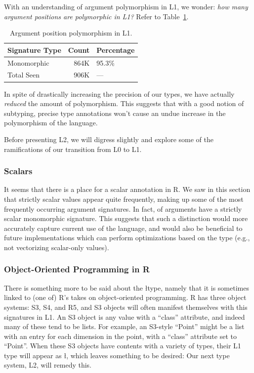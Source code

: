 \documentclass[acmsmall,10pt,review,anonymous]{acmart}\settopmatter{printfolios=true,printccs=false,printacmref=false}
\begin{document}
With an understanding of argument polymorphism in L1, we wonder: {\it how many argument positions are polymorphic in L1?}
Refer to Table~\ref{tab:argcountsL1}.

\begin{table}[ht]
\label{tab:argcountsL1}
\centering
\begin{tabular}{lrl}
  \hline
Signature Type & Count & Percentage \\ 
  \hline
Monomorphic & 864K & 95.3\% \\ 
  Total Seen & 906K & --- \\ 
   \hline
\end{tabular}
\caption{Argument position polymorphism in L1.}
\end{table}

In spite of drastically increasing the precision of our types, we have actually {\it reduced} the amount of polymorphism.
This suggests that with a good notion of subtyping, precise type annotations won't cause an undue increase in the polymorphism of the language.

Before presenting L2, we will digress slightly and explore some of the ramifications of our transition from L0 to L1.

%
%
\subsubsection{Scalars}
\label{sec:scalars}

It seems that there is a place for a scalar annotation in R.
We saw in this section that strictly scalar values appear quite frequently, making up some of the most frequently occurring argument signatures.
In fact, \PERCSCALARMONO of arguments have a strictly scalar monomorphic signature.
This suggests that such a distinction would more accurately capture current use of the language, and would also be beneficial to future implementations which can perform optimizations based on the type (e.g., not vectorizing scalar-only values).

%
%
\subsubsection{Object-Oriented Programming in R}
\label{sec:S3S4R5}

There is something more to be said about the \l type, namely that it is sometimes linked to (one of) R's takes on object-oriented programming.
R has three object systems: S3, S4, and R5, and S3 objects will often manifest themselves with this signatures in L1.
An S3 object is any value with a ``class'' attribute, and indeed many of these tend to be lists.
For example, an S3-style ``Point'' might be a list with an entry for each dimension in the point, with a ``class'' attribute set to ``Point''.
When these S3 objects have contents with a variety of types, their L1 type will appear as \l, which leaves something to be desired:
Our next type system, L2, will remedy this.
\end{document}
